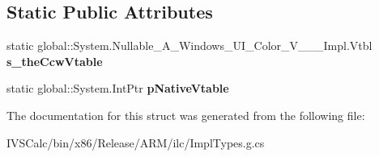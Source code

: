 \subsection*{Static Public Attributes}
\begin{DoxyCompactItemize}
\item 
\mbox{\label{struct_system_1_1_nullable___a___windows___u_i___color___v_______impl_1_1_vtbl_ab87b2f5cc6448e0094d4bd06c98c2df7}} 
static global\+::\+System.\+Nullable\+\_\+\+A\+\_\+\+Windows\+\_\+\+U\+I\+\_\+\+Color\+\_\+\+V\+\_\+\+\_\+\+\_\+\+Impl.\+Vtbl {\bfseries s\+\_\+the\+Ccw\+Vtable}
\item 
\mbox{\label{struct_system_1_1_nullable___a___windows___u_i___color___v_______impl_1_1_vtbl_a836d6872149a842145ed63fe6bd11f6a}} 
static global\+::\+System.\+Int\+Ptr {\bfseries p\+Native\+Vtable}
\end{DoxyCompactItemize}


The documentation for this struct was generated from the following file\+:\begin{DoxyCompactItemize}
\item 
I\+V\+S\+Calc/bin/x86/\+Release/\+A\+R\+M/ilc/Impl\+Types.\+g.\+cs\end{DoxyCompactItemize}
